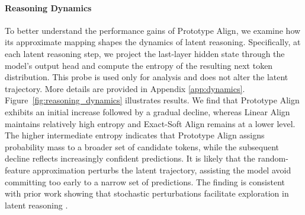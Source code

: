 \documentclass[11pt]{article}
\begin{document}
\paragraph{Reasoning Dynamics} To better understand the performance gains of Prototype Align, we examine how its approximate mapping shapes the dynamics of latent reasoning.
Specifically, at each latent reasoning step, we project the last-layer hidden state through the model's output head and compute the entropy of the resulting next token distribution. This probe is used only for analysis and does not alter the latent trajectory. More details are provided in Appendix \ref{app:dynamics}. Figure~\ref{fig:reasoning_dynamics} illustrates results. We find that Prototype Align exhibits an initial increase followed by a gradual decline, whereas Linear Align maintains relatively high entropy and Exact-Soft Align remains at a lower level. 
The higher intermediate entropy indicates that Prototype Align assigns probability mass to a broader set of candidate tokens, while the subsequent decline reflects increasingly confident predictions. It is likely that the random-feature approximation perturbs the latent trajectory, assisting the model avoid committing too early to a narrow set of predictions. The finding is consistent with prior work showing that stochastic perturbations facilitate exploration in latent reasoning \citep{you-etal-2026-parallel}.

\end{document}
